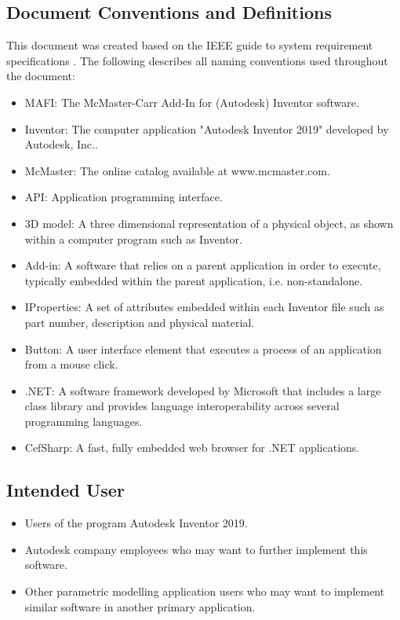 \documentclass[12pt, letterpaper]{article}
\begin{document}
\subsection{Document Conventions and Definitions}
This document was created based on the IEEE guide to system requirement specifications \cite{SRSTemplate}. The following describes all naming conventions used throughout the document:
\begin{itemize}
    \item MAFI: The McMaster-Carr Add-In for (Autodesk) Inventor software.
    \item Inventor: The computer application "Autodesk Inventor 2019" developed by Autodesk, Inc.\cite{Inventor}.
    \item McMaster: The online catalog available at www.mcmaster.com\cite{McMaster}.
    \item API: Application programming interface.
    \item 3D model: A three dimensional representation of a physical object, as shown within a computer program such as Inventor.
    \item Add-in: A software that relies on a parent application in order to execute, typically embedded within the parent application, i.e. non-standalone.
    \item IProperties: A set of attributes embedded within each Inventor file such as part number, description and physical material.
    \item Button: A user interface element that executes a process of an application from a mouse click.
    \item .NET: A software framework developed by Microsoft that includes a large class library and provides language interoperability across several programming languages\cite{NET}.
    \item CefSharp: A fast, fully embedded web browser for .NET applications\cite{CEFSharp}.
\end{itemize}
\subsection{Intended User}
\begin{itemize}
    \item Users of the program Autodesk Inventor 2019.
    \item Autodesk company employees who may want to further implement this software.
    \item Other parametric modelling application users who may want to implement similar software in another primary application.
\end{itemize}
\end{document}
